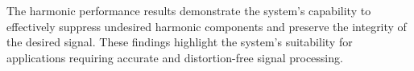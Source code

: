 The harmonic performance results demonstrate the system's capability to effectively suppress undesired harmonic components and preserve the integrity of the desired signal. These findings highlight the system's suitability for applications requiring accurate and distortion-free signal processing.


\clearpage
\thispagestyle{empty}
\cleardoublepage